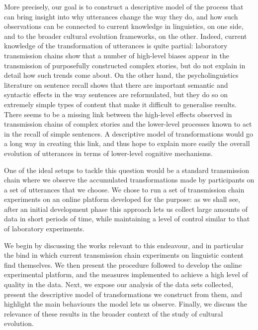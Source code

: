 More precisely, our goal is to construct a descriptive model of the
process that can bring insight into why utterances change the way they
do, and how such observations can be connected to current knowledge in
linguistics, on one side, and to the broader cultural evolution
frameworks, on the other. Indeed, current knowledge of the
transformation of utterances is quite partial: laboratory transmission
chains show that a number of high-level biases appear in the
transmission of purposefully constructed complex stories, but do not
explain in detail how such trends come about. On the other hand, the
psycholinguistics literature on sentence recall shows that there are
important semantic and syntactic effects in the way sentences are
reformulated, but they do so on extremely simple types of content that
make it difficult to generalise results. There seems to be a missing
link between the high-level effects observed in
transmission chains of complex stories and the lower-level processes known to act in the recall of simple sentences. A descriptive
model of transformations would go a long way in creating this link, and thus hope to explain more easily the overall evolution of utterances in terms of lower-level cognitive mechanisms.

One of the ideal setups to tackle this question would be a standard transmission
chain where we observe the accumulated transformations made by
participants on a set of utterances that we choose. 
We chose to run a set of transmission chain experiments on an online platform developed for the purpose: as we shall see, after an initial development phase this approach lets us collect large amounts of data in short periods of time, while maintaining a level of control similar to that of laboratory experiments.

We begin by discussing the works relevant to this endeavour, and in
particular the bind in which current transmission chain experiments on
linguistic content find themselves. We then present the procedure
followed to develop the online experimental platform, and the measures
implemented to achieve a high level of quality in the data. Next, we
expose our analysis of the data sets collected, present the descriptive
model of transformations we construct from them, and highlight the main
behaviours the model lets us observe. Finally, we discuss the relevance
of these results in the broader context of the study of cultural
evolution.

